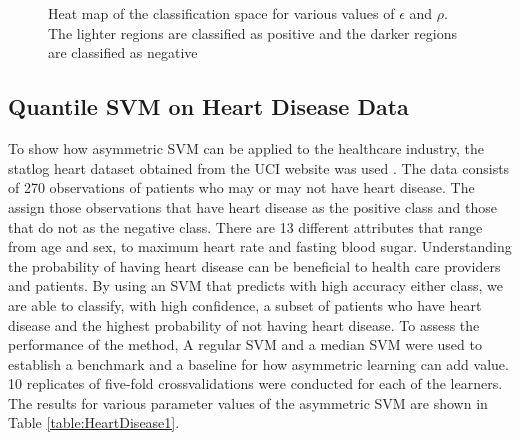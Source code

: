 \documentclass[twoside,11pt]{article}
\begin{document}
\begin{figure}[htp]
  \begin{center}
     \\
     \\
  \end{center}
  \caption{Heat map of the classification space for various values of $\epsilon$ and $\rho$. The lighter regions are classified as positive and the darker regions are classified as negative}
  \label{fig:edge}
\end{figure}



\subsection{Quantile SVM on Heart Disease Data}\label{Heartdiseasesection}
To show how asymmetric SVM can be applied to the healthcare industry, the statlog heart dataset obtained from the UCI website was used \citep{Frank10}. The data consists of 270 observations of patients who may or may not have heart disease. The assign those observations that have heart disease as the positive class and those that do not as the negative class. There are 13 different attributes that range from age and sex, to maximum heart rate and fasting blood sugar. Understanding the probability of having heart disease can be beneficial to health care providers and patients. By using an SVM that predicts with high accuracy either class, we are able to classify, with high confidence, a subset of patients who have heart disease and the highest probability of not having heart disease. To assess the performance of the method, A regular SVM and a median SVM were used to establish a benchmark and a baseline for how asymmetric learning can add value. 10 replicates of five-fold crossvalidations were conducted for each of the learners. The results for various parameter values of the asymmetric SVM are shown in Table \ref{table:HeartDisease1}. 
\end{document}
